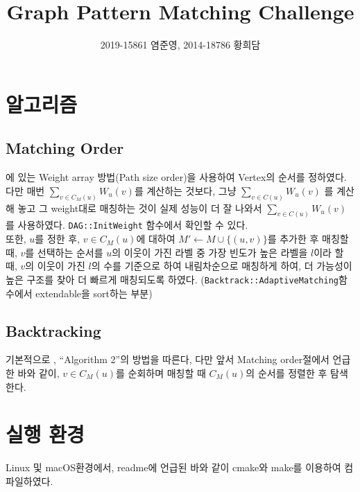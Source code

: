\documentclass{article}
\author{2019-15861 염준영, 2014-18786 황희담}
\title{Graph Pattern Matching Challenge}
\begin{document}
\maketitle
\section{알고리즘}
\subsection{Matching Order}

\cite{10.1145/3299869.3319880}에 있는 Weight array 방법(Path size order)을 사용하여 Vertex의 순서를 정하였다.
다만 매번 \(\sum_{v \in C_{M}(u)} W_{u}(v)\)를 계산하는 것보다, 그냥 \(\sum_{v \in C(u)} W_{u}(v)\) 를 계산해 놓고
그 weight대로 매칭하는 것이 실제 성능이 더 잘 나와서 \(\sum_{v \in C(u)} W_{u}(v)\)를 사용하였다.
\verb|DAG::InitWeight| 함수에서 확인할 수 있다.\\
또한, \(u\)를 정한 후, \(v \in C_{M}(u)\)에 대하여 \(M' \leftarrow M \cup \{(u, v)\}\)를 추가한 후
매칭할 때, \(v\)를 선택하는 순서를 \(u\)의 이웃이 가진 라벨 중 가장 빈도가 높은 라벨을 \(l\)이라 할 때,
\(v\)의 이웃이 가진 \(l\)의 수를 기준으로 하여 내림차순으로 매칭하게 하여, 
더 가능성이 높은 구조를 찾아 더 빠르게 매칭되도록 하였다.
(\verb|Backtrack::AdaptiveMatching|함수에서 extendable을 sort하는 부분)

\subsection{Backtracking}
기본적으로 \cite{10.1145/3299869.3319880}, ``Algorithm 2''의 방법을 따른다, 
다만 앞서 Matching order절에서 언급한 바와 같이, \(v \in C_M(u)\)를 순회하며 매칭할 때 
\(C_M(u)\)의 순서를 정렬한 후 탐색한다.


\section{실행 환경}
Linux 및 macOS환경에서, readme에 언급된 바와 같이 cmake와 make를 이용하여 컴파일하였다.
    
\printbibliography
\end{document}
